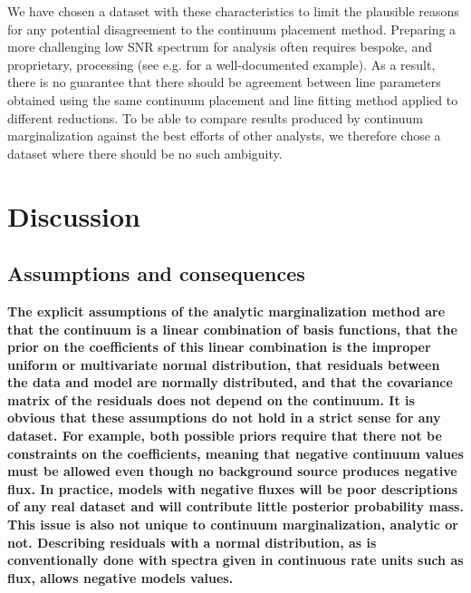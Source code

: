 \documentclass[trackchanges]{aastex62}
\begin{document}
{We have chosen a dataset with these characteristics to limit the plausible reasons for any potential disagreement to the continuum placement method.
Preparing a more challenging low SNR spectrum for analysis often requires bespoke, and proprietary, processing (see e.g. \citealt{Wakker:2015} for a well-documented example).
As a result, there is no guarantee that there should be agreement between line parameters obtained using the same continuum placement and line fitting method applied to different reductions.
To be able to compare results produced by continuum marginalization against the best efforts of other analysts, we therefore chose a dataset where there should be no such ambiguity.
}


\section{Discussion}
\label{sec:discussion}
\subsection{Assumptions and consequences}
{\color{red}\bf
The explicit assumptions of the analytic marginalization method are that the continuum is a linear combination of basis functions, that the prior on the coefficients of this linear combination is the improper uniform or multivariate normal distribution, that residuals between the data and model are normally distributed, and that the covariance matrix of the residuals does not depend on the continuum.
It is obvious that these assumptions do not hold in a strict sense for any dataset.
For example, both possible priors require that there not be constraints on the coefficients, meaning that negative continuum values must be allowed even though no background source produces negative flux.
In practice, models with negative fluxes will be poor descriptions of any real dataset and will contribute little posterior probability mass.
This issue is also not unique to continuum marginalization, analytic or not.
Describing residuals with a normal distribution, as is conventionally done with spectra given in continuous rate units such as flux, allows negative models values.
}
\end{document}
